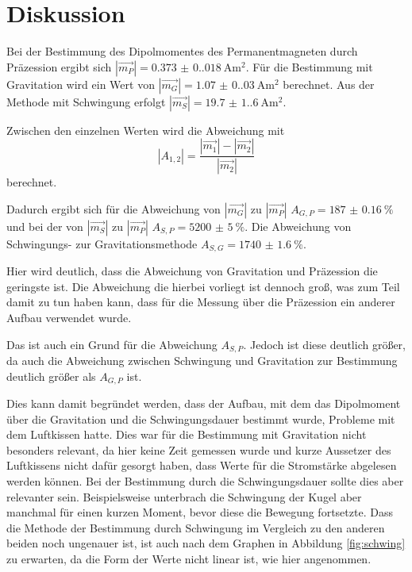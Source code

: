 \section{Diskussion}
Bei der Bestimmung des Dipolmomentes des Permanentmagneten durch Präzession ergibt sich $|\vec{m_P}|=\qty{0.373(0.018)}{\ampere\meter\squared}$.
Für die Bestimmung mit Gravitation wird ein Wert von $|\vec{m_G}|=\qty{1.07(0.03)}{\ampere\meter\squared}$ berechnet.
Aus der Methode mit Schwingung erfolgt $|\vec{m_S}|=\qty{19.7(1.6)}{\ampere\meter\squared}$.

Zwischen den einzelnen Werten wird die Abweichung mit 
\begin{equation}
    |A_{1,2}|=\frac{|\vec{m_1}|-|\vec{m_2}|}{|\vec{m_2}|}
\end{equation}
berechnet.

Dadurch ergibt sich für die Abweichung von $|\vec{m_G}|$ zu $|\vec{m_P}|$ $A_{G,P}=\qty{187(0.16)}{\percent}$ und bei der von $|\vec{m_S}|$ zu $|\vec{m_P}|$ $A_{S,P}=\qty{5200(5)}{\percent}$.
Die Abweichung von Schwingungs- zur Gravitationsmethode $A_{S,G}=\qty{1740(1.6)}{\percent}$.

Hier wird deutlich, dass die Abweichung von Gravitation und Präzession die geringste ist.
Die Abweichung die hierbei vorliegt ist dennoch groß, was zum Teil damit zu tun haben kann, dass für die Messung über die 
Präzession ein anderer Aufbau verwendet wurde.

Das ist auch ein Grund für die Abweichung $A_{S,P}$.
Jedoch ist diese deutlich größer, da auch die Abweichung zwischen Schwingung und Gravitation zur Bestimmung deutlich größer als $A_{G,P}$ ist.

Dies kann damit begründet werden, dass der Aufbau, mit dem das Dipolmoment über die Gravitation und 
die Schwingungsdauer bestimmt wurde, Probleme mit dem Luftkissen hatte.
Dies war für die Bestimmung mit Gravitation nicht besonders relevant, da hier keine Zeit gemessen wurde und kurze Aussetzer des Luftkissens nicht dafür gesorgt haben, dass Werte für die Stromstärke abgelesen werden können.
Bei der Bestimmung durch die Schwingungsdauer sollte dies aber relevanter sein.
Beispielsweise unterbrach die Schwingung der Kugel aber manchmal für 
einen kurzen Moment, bevor diese die Bewegung fortsetzte.
Dass die Methode der Bestimmung durch Schwingung im Vergleich zu den anderen beiden noch ungenauer ist, ist auch nach dem Graphen in Abbildung \ref{fig:schwing} zu erwarten, da die Form der Werte nicht linear ist, wie hier angenommen.
\label{sec:Diskussion}
